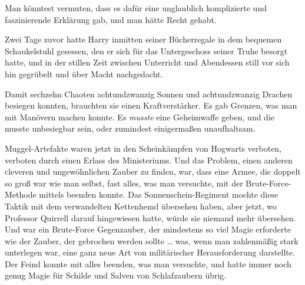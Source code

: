 Man könntest vermuten, dass es dafür eine unglaublich komplizierte und faszinierende Erklärung gab, und man hätte Recht gehabt.

Zwei Tage zuvor hatte Harry inmitten seiner Bücherregale in dem bequemen Schaukelstuhl gesessen, den er sich für das Untergeschoss seiner Truhe besorgt hatte, und in der stillen Zeit zwischen Unterricht und Abendessen still vor sich hin gegrübelt und über Macht nachgedacht.

Damit sechzehn Chaoten achtundzwanzig Sonnen und achtundzwanzig Drachen besiegen konnten, brauchten sie einen Kraftverstärker. Es gab Grenzen, was man mit Manövern machen konnte. Es \emph{musste} eine Geheimwaffe geben, und die musste unbesiegbar sein, oder zumindest einigermaßen unaufhaltsam.

Muggel-Artefakte waren jetzt in den Scheinkämpfen von Hogwarts verboten, verboten durch einen Erlass des Ministeriums. Und das Problem, einen anderen cleveren und ungewöhnlichen Zauber zu finden, war, dass eine Armee, die doppelt so groß war wie man selbst, fast alles, was man versuchte, mit der Brute-Force-Methode mittels  beenden konnte. Das Sonnenschein-Regiment mochte diese Taktik mit dem verwandelten Kettenhemd übersehen haben, aber jetzt, wo Professor Quirrell darauf hingewiesen hatte, würde sie niemand mehr übersehen. Und  war ein Brute-Force Gegenzauber, der mindestens so viel Magie erforderte wie der Zauber, der gebrochen werden sollte … was, wenn man zahlenmäßig stark unterlegen war, eine ganz neue Art von militärischer Herausforderung darstellte. Der Feind konnte mit  alles beenden, was man versuchte, und hatte immer noch genug Magie für Schilde und Salven von Schlafzaubern übrig.


